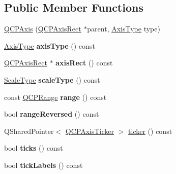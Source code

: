 \subsection*{Public Member Functions}
\begin{DoxyCompactItemize}
\item 
\hyperlink{class_q_c_p_axis_ac62c042968bae0e6d474fcfc57c9b71f}{Q\+C\+P\+Axis} (\hyperlink{class_q_c_p_axis_rect}{Q\+C\+P\+Axis\+Rect} $\ast$parent, \hyperlink{class_q_c_p_axis_ae2bcc1728b382f10f064612b368bc18a}{Axis\+Type} type)
\item 
\mbox{\label{class_q_c_p_axis_aa19679359783c5ecd27757b7e5619976}} 
\hyperlink{class_q_c_p_axis_ae2bcc1728b382f10f064612b368bc18a}{Axis\+Type} {\bfseries axis\+Type} () const
\item 
\mbox{\label{class_q_c_p_axis_afc94bcfdf8adfe8e01013f13bdf159a2}} 
\hyperlink{class_q_c_p_axis_rect}{Q\+C\+P\+Axis\+Rect} $\ast$ {\bfseries axis\+Rect} () const
\item 
\mbox{\label{class_q_c_p_axis_ad23e9ad97b44e9aeaf4fab8904280098}} 
\hyperlink{class_q_c_p_axis_a36d8e8658dbaa179bf2aeb973db2d6f0}{Scale\+Type} {\bfseries scale\+Type} () const
\item 
\mbox{\label{class_q_c_p_axis_ac4058855a81f1a883cf2e754f6a6acb1}} 
const \hyperlink{class_q_c_p_range}{Q\+C\+P\+Range} {\bfseries range} () const
\item 
\mbox{\label{class_q_c_p_axis_ab9866dd1a78f1920f491ec12a794bec2}} 
bool {\bfseries range\+Reversed} () const
\item 
Q\+Shared\+Pointer$<$ \hyperlink{class_q_c_p_axis_ticker}{Q\+C\+P\+Axis\+Ticker} $>$ \hyperlink{class_q_c_p_axis_a7b7a27151be8235059e1294f73ecf615}{ticker} () const
\item 
\mbox{\label{class_q_c_p_axis_a5c3da767a2dc990f200856a9e27ea06e}} 
bool {\bfseries ticks} () const
\item 
\mbox{\label{class_q_c_p_axis_ae4158bbc52939ee52cdb12b805860a28}} 
bool {\bfseries tick\+Labels} () const
\item 
\mbox{\label{class_q_c_p_axis_afac7316ca35941e7080f98e0022c1891}} 

\end{DoxyCompactItemize}
